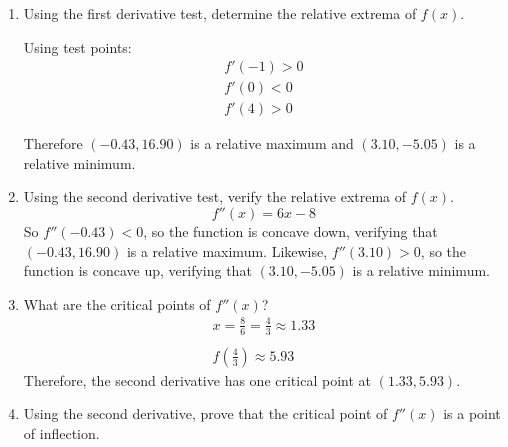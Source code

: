 \documentclass[letterpaper,12pt,fleqn]{article}
\begin{document}
\begin{enumerate}
\item Using the first derivative test, determine the relative extrema of \(f(x)\).

  \begin{center}

    Using test points:
    \begin{gather*}
      f'(-1)>0 \\
      f'(0)<0 \\
      f'(4)>0
    \end{gather*}
  \end{center}

  Therefore \((-0.43,16.90)\) is a relative maximum and \((3.10,-5.05)\) is a relative minimum.
  
\item Using the second derivative test, verify the relative extrema of \(f(x)\).
  \[f''(x)=6x-8\]
  So \(f''(-0.43)<0\), so the function is concave down, verifying that \((-0.43,16.90)\) is a relative maximum.
  Likewise, \(f''(3.10)>0\), so the function is concave up, verifying that \((3.10,-5.05)\) is a relative minimum.
  
\item What are the critical points of \(f''(x)\)?
  \begin{gather*}
    x=\frac{8}{6}=\frac{4}{3}\approx1.33 \\
    \\
    f\left(\frac{4}{3}\right)\approx5.93
  \end{gather*}
  Therefore, the second derivative has one critical point at \((1.33,5.93)\).

\item Using the second derivative, prove that the critical point of \(f''(x)\) is a point of inflection.
  \begin{center}
  \end{center}


\end{enumerate}
\end{document}
